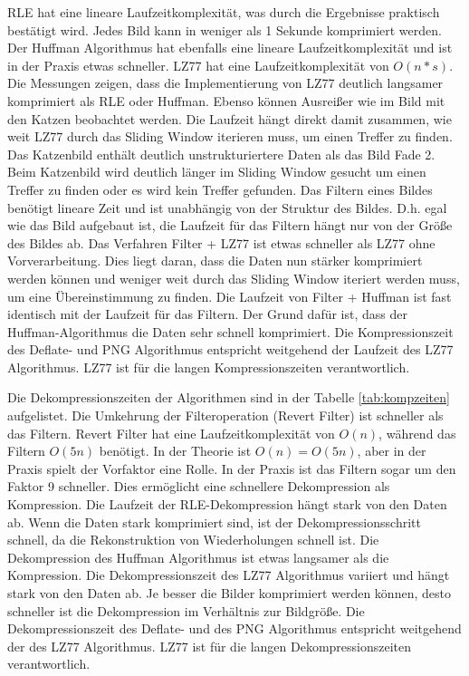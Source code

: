 \documentclass[conference]{IEEEtran}
\begin{document}
RLE hat eine lineare Laufzeitkomplexität, was durch die Ergebnisse
praktisch bestätigt wird.
Jedes Bild kann in weniger als 1 Sekunde komprimiert werden.
Der Huffman Algorithmus hat ebenfalls eine lineare Laufzeitkomplexität
und ist in der Praxis etwas schneller.
LZ77 hat eine Laufzeitkomplexität von $O(n * s)$.
Die Messungen zeigen, dass die Implementierung von LZ77 deutlich
langsamer komprimiert als RLE oder Huffman.
Ebenso können Ausreißer wie im Bild mit den Katzen beobachtet werden.
Die Laufzeit hängt direkt damit zusammen, wie weit LZ77 durch das
Sliding Window iterieren muss, um einen Treffer zu finden.
Das Katzenbild enthält deutlich unstrukturiertere Daten als das Bild
Fade 2.
Beim Katzenbild wird deutlich länger im Sliding Window gesucht um
einen Treffer zu finden oder es wird kein Treffer gefunden.
Das Filtern eines Bildes benötigt lineare Zeit und ist unabhängig
von der Struktur des Bildes.
D.h. egal wie das Bild aufgebaut ist, die Laufzeit für das Filtern
hängt nur von der Größe des Bildes ab.
Das Verfahren Filter + LZ77 ist etwas schneller als LZ77 ohne Vorverarbeitung.
Dies liegt daran, dass die Daten nun stärker komprimiert werden können und
weniger weit durch das Sliding Window iteriert werden muss, um eine
Übereinstimmung zu finden.
Die Laufzeit von Filter + Huffman ist fast identisch mit der Laufzeit
für das Filtern.
Der Grund dafür ist, dass der Huffman-Algorithmus die Daten sehr
schnell komprimiert.
Die Kompressionszeit des Deflate- und PNG Algorithmus entspricht
weitgehend der Laufzeit des LZ77 Algorithmus.
LZ77 ist für die langen Kompressionszeiten verantwortlich. \par

Die Dekompressionszeiten der Algorithmen sind in der Tabelle
\ref{tab:kompzeiten} aufgelistet.
Die Umkehrung der Filteroperation (Revert Filter) ist
schneller als das Filtern.
Revert Filter hat eine Laufzeitkomplexität von $O(n)$, während das Filtern
$O(5n)$ benötigt.
In der Theorie ist $O(n) = O(5n)$, aber in der Praxis spielt der
Vorfaktor eine Rolle.
In der Praxis ist das Filtern sogar um den Faktor 9 schneller.
Dies ermöglicht eine schnellere Dekompression als Kompression.
Die Laufzeit der RLE-Dekompression hängt stark von den Daten ab.
Wenn die Daten stark komprimiert sind, ist der Dekompressionsschritt
schnell, da die Rekonstruktion von Wiederholungen schnell ist.
Die Dekompression des Huffman Algorithmus ist etwas langsamer
als die Kompression.
Die Dekompressionszeit des LZ77 Algorithmus variiert und hängt
stark von den Daten ab.
Je besser die Bilder komprimiert werden können, desto schneller
ist die Dekompression im Verhältnis zur Bildgröße.
Die Dekompressionszeit des Deflate- und des PNG Algorithmus entspricht
weitgehend der des LZ77 Algorithmus.
LZ77 ist für die langen Dekompressionszeiten verantwortlich.
\end{document}
